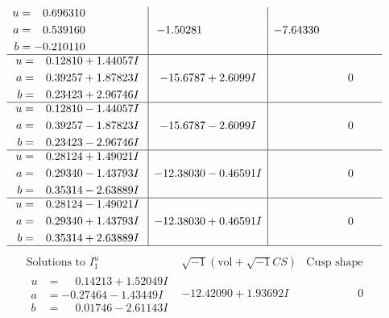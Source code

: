\documentclass[1p]{elsarticle_modified}
\theoremstyle{definition}
\newcommand{\I}{\sqrt{-1}}
\begin{document}
$$\begin{array}{c|c|c}
\begin{aligned}
u &= \phantom{-}0.696310\phantom{ +0.000000I} \\
a &= \phantom{-}0.539160\phantom{ +0.000000I} \\
b &= -0.210110\phantom{ +0.000000I}\end{aligned}
 & -1.50281\phantom{ +0.000000I} & -7.64330\phantom{ +0.000000I} \\ \hline\begin{aligned}
u &= \phantom{-}0.12810 + 1.44057 I \\
a &= \phantom{-}0.39257 + 1.87823 I \\
b &= \phantom{-}0.23423 + 2.96746 I\end{aligned}
 & -15.6787 + 2.6099 I & \phantom{-0.000000 } 0 \\ \hline\begin{aligned}
u &= \phantom{-}0.12810 - 1.44057 I \\
a &= \phantom{-}0.39257 - 1.87823 I \\
b &= \phantom{-}0.23423 - 2.96746 I\end{aligned}
 & -15.6787 - 2.6099 I & \phantom{-0.000000 } 0 \\ \hline\begin{aligned}
u &= \phantom{-}0.28124 + 1.49021 I \\
a &= \phantom{-}0.29340 - 1.43793 I \\
b &= \phantom{-}0.35314 - 2.63889 I\end{aligned}
 & -12.38030 - 0.46591 I & \phantom{-0.000000 } 0 \\ \hline\begin{aligned}
u &= \phantom{-}0.28124 - 1.49021 I \\
a &= \phantom{-}0.29340 + 1.43793 I \\
b &= \phantom{-}0.35314 + 2.63889 I\end{aligned}
 & -12.38030 + 0.46591 I & \phantom{-0.000000 } 0\\
 \hline 
 \end{array}$$\newpage$$\begin{array}{c|c|c}  
\text{Solutions to }I^u_{1}& \I (\text{vol} + \sqrt{-1}CS) & \text{Cusp shape}\\
 \hline 
\begin{aligned}
u &= \phantom{-}0.14213 + 1.52049 I \\
a &= -0.27464 - 1.43449 I \\
b &= \phantom{-}0.01746 - 2.61143 I\end{aligned}
 & -12.42090 + 1.93692 I & \phantom{-0.000000 } 0 \\ \hline\begin{aligned}

\end{aligned}
\end{array}$$
\end{document}
